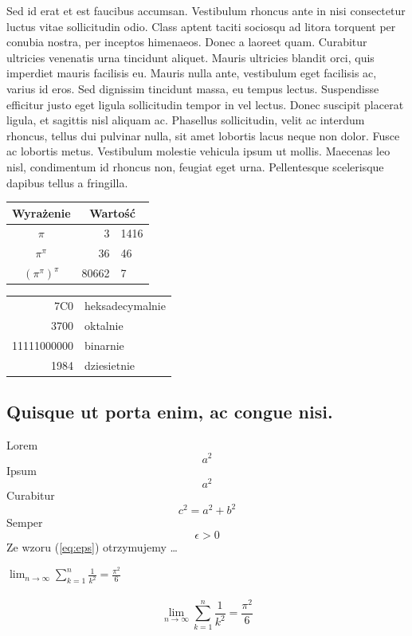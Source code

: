 \documentclass[a4paper,12pt]{article}
\begin{document}
Sed id erat et est faucibus accumsan. Vestibulum rhoncus ante in nisi consectetur luctus vitae sollicitudin odio. Class aptent taciti sociosqu ad litora torquent per conubia nostra, per inceptos himenaeos. Donec a laoreet quam. Curabitur ultricies venenatis urna tincidunt aliquet. Mauris ultricies blandit orci, quis imperdiet mauris facilisis eu. Mauris nulla ante, vestibulum eget facilisis ac, varius id eros. Sed dignissim tincidunt massa, eu tempus lectus. Suspendisse efficitur justo eget ligula sollicitudin tempor in vel lectus. Donec suscipit placerat ligula, et sagittis nisl aliquam ac. Phasellus sollicitudin, velit ac interdum rhoncus, tellus dui pulvinar nulla, sit amet lobortis lacus neque non dolor. Fusce ac lobortis metus. Vestibulum molestie vehicula ipsum ut mollis. Maecenas leo nisl, condimentum id rhoncus non, feugiat eget urna. Pellentesque scelerisque dapibus tellus a fringilla. 

\begin{tabular}{c r @{,} l}
Wyrażenie &
\multicolumn{2}{c}{Wartość}\\ \hline
$\pi$ & 3&1416 \\
$\pi^{\pi}$ & 36&46 \\
$(\pi^{\pi})^{\pi}$ & 80662&7 \\
\end{tabular}


\begin{tabular}{|r|l|} \hline
7C0 & heksadecymalnie \\
3700 & oktalnie \\
11111000000 & binarnie \\
\hline \hline
1984 & dziesietnie \\ \hline
\end{tabular}

\subsection{Quisque ut porta enim, ac congue nisi.}
Lorem
$$ a^{2} $$
Ipsum
\[ a^{2} \]
Curabitur
\begin{displaymath}
c^{2}=a^{2}+b^{2}
\end{displaymath}
Semper
\begin{equation}
\epsilon > 0 \label{eq:eps}
\end{equation}
Ze wzoru (\ref{eq:eps}) otrzymujemy \ldots


$\lim_{n \to \infty}
\sum_{k=1}^n \frac{1}{k^2}
= \frac{\pi^2}{6}$
\\ \\
$$
\lim_{n \to \infty}
\sum_{k=1}^n \frac{1}{k^2}
= \frac{\pi^2}{6}
$$
\end{document}

